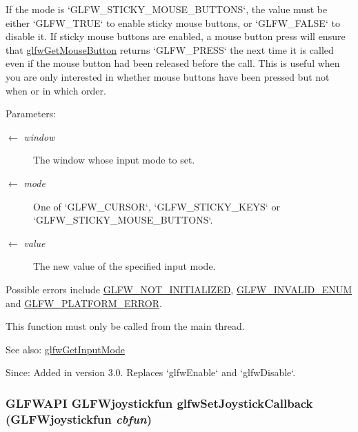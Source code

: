 If the mode is `GLFW\_\-STICKY\_\-MOUSE\_\-BUTTONS`, the value must be either `GLFW\_\-TRUE` to enable sticky mouse buttons, or `GLFW\_\-FALSE` to disable it. If sticky mouse buttons are enabled, a mouse button press will ensure that \hyperlink{group__input_g6da5efb04f700c312a57a169fa9393a0}{glfwGetMouseButton} returns `GLFW\_\-PRESS` the next time it is called even if the mouse button had been released before the call. This is useful when you are only interested in whether mouse buttons have been pressed but not when or in which order.

\begin{Desc}
\item[Parameters:]
\begin{description}
\item[\mbox{$\leftarrow$} {\em window}]The window whose input mode to set. \item[\mbox{$\leftarrow$} {\em mode}]One of `GLFW\_\-CURSOR`, `GLFW\_\-STICKY\_\-KEYS` or `GLFW\_\-STICKY\_\-MOUSE\_\-BUTTONS`. \item[\mbox{$\leftarrow$} {\em value}]The new value of the specified input mode.\end{description}
\end{Desc}
Possible errors include \hyperlink{group__errors_g2374ee02c177f12e1fa76ff3ed15e14a}{GLFW\_\-NOT\_\-INITIALIZED}, \hyperlink{group__errors_g76f6bb9c4eea73db675f096b404593ce}{GLFW\_\-INVALID\_\-ENUM} and \hyperlink{group__errors_gd44162d78100ea5e87cdd38426b8c7a1}{GLFW\_\-PLATFORM\_\-ERROR}.

This function must only be called from the main thread.

\begin{Desc}
\item[See also:]\hyperlink{group__input_g1248dd5b1e566b2817e71547564d6af9}{glfwGetInputMode}\end{Desc}
\begin{Desc}
\item[Since:]Added in version 3.0. Replaces `glfwEnable` and `glfwDisable`. \end{Desc}
\hypertarget{group__input_g07524a1122a03642b1d28822ea931094}{
\subsubsection[glfwSetJoystickCallback]{\setlength{\rightskip}{0pt plus 5cm}GLFWAPI {\bf GLFWjoystickfun} glfwSetJoystickCallback ({\bf GLFWjoystickfun} {\em cbfun})}}
\label{group__input_g07524a1122a03642b1d28822ea931094}


